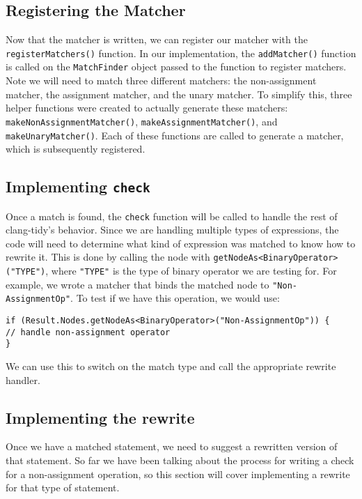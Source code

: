 \subsection{Registering the Matcher}

Now that the matcher is written, we can register our matcher with the \texttt{registerMatchers()} function. In our implementation, the \texttt{addMatcher()} function is called on the \texttt{MatchFinder} object passed to the function to register matchers. Note we will need to match three different matchers: the non-assignment matcher, the assignment matcher, and the unary matcher. To simplify this, three helper functions were created to actually generate these matchers: \texttt{makeNonAssignmentMatcher()}, \texttt{makeAssignmentMatcher()}, and \texttt{makeUnaryMatcher()}. Each of these functions are called to generate a matcher, which is subsequently registered.

\subsection{Implementing \texttt{check}}
Once a match is found, the \texttt{check} function will be called to handle the rest of clang-tidy's behavior. Since we are handling multiple types of expressions, the code will need to determine what kind of expression was matched to know how to rewrite it. This is done by calling the node with \texttt{getNodeAs<BinaryOperator>("TYPE")}, where \texttt{"TYPE"} is the type of binary operator we are testing for. For example, we wrote a matcher that binds the matched node to \texttt{"Non-AssignmentOp"}. To test if we have this operation, we would use:
\begin{center}
\parbox{0.9\linewidth}{
\texttt{if (Result.Nodes.getNodeAs<BinaryOperator>("Non-AssignmentOp")) \{\\
\hspace*{2em}// handle non-assignment operator\\
\}}
}
\end{center}

We can use this to switch on the match type and call the appropriate rewrite handler.

\subsection{Implementing the rewrite}

Once we have a matched statement, we need to suggest a rewritten version of that statement. So far we have been talking about the process for writing a check for a non-assignment operation, so this section will cover implementing a rewrite for that type of statement.

